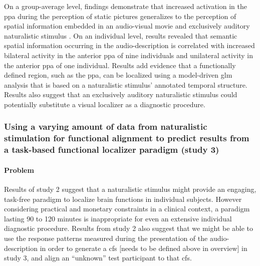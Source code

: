 On a group-average level, findings demonstrate that increased activation in the
\ac{ppa} during the perception of static pictures generalizes to the perception
of spatial information embedded in an audio-visual movie and exclusively
auditory naturalistic stimulus \citep{haeusler2022processing}.
On an individual level, results revealed that semantic spatial information
occurring in the audio-description is correlated with increased bilateral
activity in the anterior \ac{ppa} of nine individuals and unilateral activity in
the anterior \ac{ppa} of one individual.
Results add evidence \citep[cf.][]{bartels2004mapping} that a functionally
defined region, such as the \ac{ppa}, can be localized using a model-driven
\ac{glm} analysis that is based on a naturalistic stimulus' annotated temporal
structure.
Results also suggest that an exclusively auditory naturalistic stimulus could
potentially substitute a visual localizer as a diagnostic procedure.



\subsubsection{Using a varying amount of data from naturalistic stimulation for
functional alignment to predict results from a task-based functional localizer
paradigm (study 3)}






\paragraph{Problem}
Results of study 2 suggest that a naturalistic stimulus might provide an
engaging, task-free paradigm to localize brain functions in individual subjects.
%
However considering practical and monetary constraints in a clinical context, a
paradigm lasting 90 to 120 minutes is inappropriate for even an extensive
individual diagnostic procedure.
%
Results from study 2 also suggest that we might be able to use the response
patterns measured during the presentation of the audio-description in order to
generate a \ac{cfs} [needs to be defined above in overview] in study 3, and
align an ``unknown'' test participant to that \ac{cfs}.


